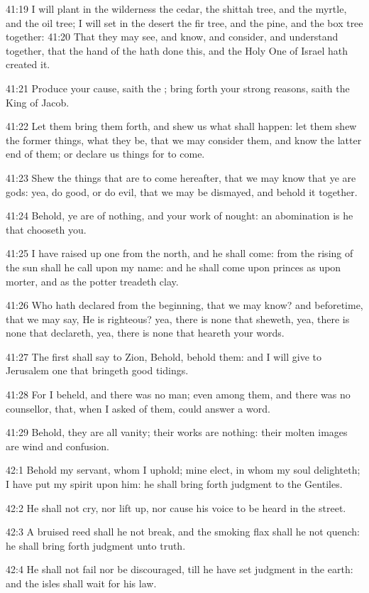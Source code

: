 41:19 I will plant in the wilderness the cedar, the shittah tree, and the myrtle, and the oil tree; I will set in the desert the fir tree, and the pine, and the box tree together: 41:20 That they may see, and know, and consider, and understand together, that the hand of the \LORD hath done this, and the Holy One of Israel hath created it.

41:21 Produce your cause, saith the \LORD; bring forth your strong reasons, saith the King of Jacob.

41:22 Let them bring them forth, and shew us what shall happen: let them shew the former things, what they be, that we may consider them, and know the latter end of them; or declare us things for to come.

41:23 Shew the things that are to come hereafter, that we may know that ye are gods: yea, do good, or do evil, that we may be dismayed, and behold it together.

41:24 Behold, ye are of nothing, and your work of nought: an abomination is he that chooseth you.

41:25 I have raised up one from the north, and he shall come: from the rising of the sun shall he call upon my name: and he shall come upon princes as upon morter, and as the potter treadeth clay.

41:26 Who hath declared from the beginning, that we may know? and beforetime, that we may say, He is righteous? yea, there is none that sheweth, yea, there is none that declareth, yea, there is none that heareth your words.

41:27 The first shall say to Zion, Behold, behold them: and I will give to Jerusalem one that bringeth good tidings.

41:28 For I beheld, and there was no man; even among them, and there was no counsellor, that, when I asked of them, could answer a word.

41:29 Behold, they are all vanity; their works are nothing: their molten images are wind and confusion.

42:1 Behold my servant, whom I uphold; mine elect, in whom my soul delighteth; I have put my spirit upon him: he shall bring forth judgment to the Gentiles.

42:2 He shall not cry, nor lift up, nor cause his voice to be heard in the street.

42:3 A bruised reed shall he not break, and the smoking flax shall he not quench: he shall bring forth judgment unto truth.

42:4 He shall not fail nor be discouraged, till he have set judgment in the earth: and the isles shall wait for his law.

